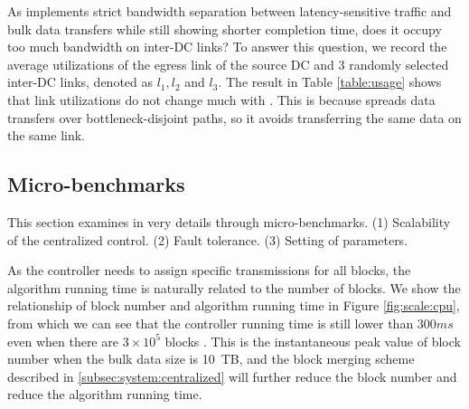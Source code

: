 As \name implements strict bandwidth separation between latency-sensitive traffic and bulk data transfers while still showing shorter completion time, does it occupy too much bandwidth on inter-DC links? To answer this question, we record the average utilizations of the egress link of the source DC and 3 randomly selected inter-DC links, denoted as $l_1,l_2$ and $l_3$. The result in Table \ref{table:usage} shows that link utilizations do not change much with \name. This is because \name spreads data transfers over bottleneck-disjoint paths, so it avoids transferring the same data on the same link.


\subsection{Micro-benchmarks}
\label{subsec:evaluation:benchmarks}

This section examines \name in very details through micro-benchmarks.
(1) Scalability of the centralized control.
(2) Fault tolerance.
(3) Setting of \name parameters.

\label{subsec:evaluation:benchmarks:scalability}

 As the controller needs to assign specific transmissions for all blocks, the algorithm running time is naturally related to the number of blocks. We show the relationship of block number and algorithm running time in Figure \ref{fig:scale:cpu}, from which we can see that the controller running time is still lower than $300ms$ even when there are $3\times 10^5$ blocks . This is the instantaneous peak value of block number when the bulk data size is 10~TB, and the block merging scheme described in \Section\ref{subsec:system:centralized} will further reduce the block number and reduce the algorithm running time.

